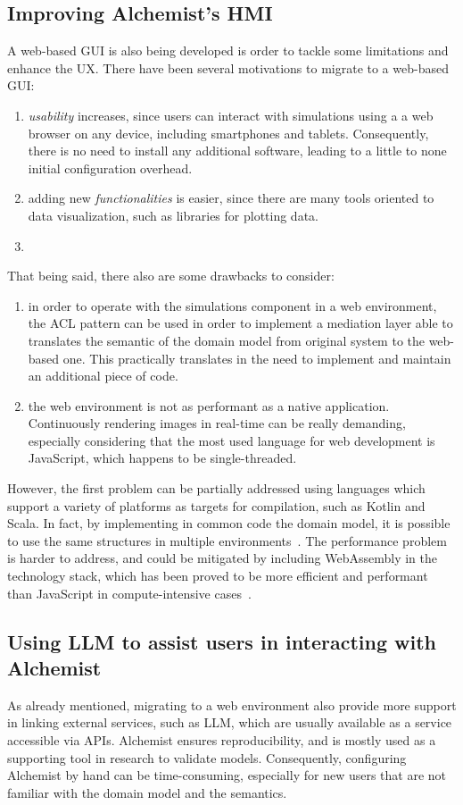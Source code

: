 \documentclass[conference]{IEEEtran}
\begin{document}
\subsection{Improving Alchemist's \ac{HMI}}
A web-based \ac{GUI} is also being developed is order to tackle some limitations and enhance the \ac{UX}.
%
There have been several motivations to migrate to a web-based \ac{GUI}:
\begin{enumerate}
    \item \emph{usability} increases,
    since users can interact with simulations using a a web browser on any device,
    including smartphones and tablets.
    Consequently,
    there is no need to install any additional software,
    leading to a little to none initial configuration overhead.
    \item adding new \emph{functionalities} is easier,
    since there are many tools oriented to data visualization,
    such as libraries for plotting data.
    \item
\end{enumerate}
That being said,
there also are some drawbacks to consider:
\begin{enumerate}
    \item in order to operate with the simulations component in a web environment,
    the \ac{ACL} pattern can be used in order to implement a mediation layer able to translates the semantic of the domain model from original system to the web-based one.
    This practically translates in the need to implement and maintain an additional piece of code.
    \item the web environment is not as performant as a native application.
    Continuously rendering images in real-time can be really demanding,
    especially considering that the most used language for web development is JavaScript,
    which happens to be single-threaded.
\end{enumerate}

However,
the first problem can be partially addressed using languages which support a  variety of platforms as targets for compilation,
such as Kotlin and Scala.
%
In fact,
by implementing in common code the domain model,
it is possible to use the same structures in multiple environments~\cite{DBLP:conf/dais/FilasetaP23}.
%
The performance problem is harder to address,
and could be mitigated by including WebAssembly in the technology stack,
which has been proved to be more efficient and performant than JavaScript in compute-intensive cases~\cite{DBLP:conf/ict4s/Macedo0PS22}.
%
\subsection{Using \ac{LLM} to assist users in interacting with Alchemist}
As already mentioned,
migrating to a web environment also provide more support in linking external services,
such as \ac{LLM},
which are usually available as a service accessible via \acp{API}.
%
Alchemist ensures reproducibility,
and is mostly used as a supporting tool in research to validate models.
%
Consequently,
configuring Alchemist by hand can be time-consuming,
especially for new users that are not familiar with the domain model and the semantics.
%
\end{document}
